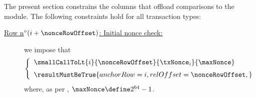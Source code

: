 \begin{center}
\end{center}
The present section constrains the columns that offload comparisons to the \wcpMod{} module.
The following constraints hold for all transaction types:
\begin{description}
	\item[\underline{\underline{Row n$^\circ(i + \nonceRowOffset)$: Initial nonce check:}}]
		we impose that
		\[
			\left\{\begin{array}{l}
				\smallCallToLt
				{i}{\nonceRowOffset}
				{\txNonce_{i}}
				{\maxNonce}
				\vspace{2mm}
				\\
                                \resultMustBeTrue {
                                        anchorRow = i               ,
                                        relOffset = \nonceRowOffset ,
                                }
				\\
			\end{array}\right.
		\]
		where, as per \cite{EIP2681}, $\maxNonce \define 2^{64} - 1$.


\end{description}
